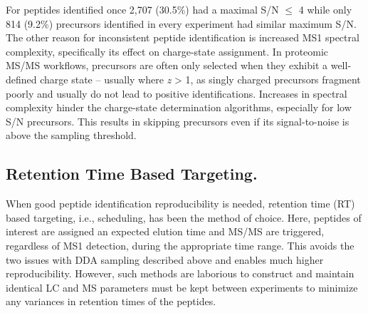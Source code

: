 For peptides identified once 2,707 (30.5\%) had a maximal S/N $\leq$ 4 while only 814 (9.2\%) precursors identified in every experiment had similar maximum S/N. The other reason for inconsistent peptide identification is increased MS1 spectral complexity, specifically its effect on charge-state assignment. In proteomic MS/MS workflows, precursors are often only selected when they exhibit a well-defined charge state -- usually where \textit{z} > 1, as singly charged precursors fragment poorly and usually do not lead to positive identifications. Increases in spectral complexity hinder the charge-state determination algorithms, especially for low S/N precursors. This results in skipping precursors even if its signal-to-noise is above the sampling threshold.

\subsection{Retention Time Based Targeting.}

When good peptide identification reproducibility is needed, retention time (RT) based targeting, i.e., scheduling, has been the method of choice. Here, peptides of interest are assigned an expected elution time and MS/MS are triggered, regardless of MS1 detection, during the appropriate time range. This avoids the two issues with DDA sampling described above and enables much higher reproducibility. However, such methods are laborious to construct and maintain identical LC and MS parameters must be kept between experiments to minimize any variances in retention times of the peptides.

